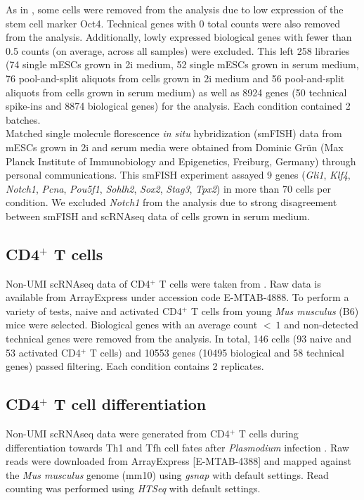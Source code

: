As in \cite{Grun2014}, some cells were removed from the analysis due to low expression of the stem cell marker Oct4. Technical genes with 0 total counts were also removed from the analysis. Additionally, lowly expressed biological genes with fewer than 0.5 counts (on average, across all samples) were excluded. This left 258 libraries (74 single mESCs grown in 2i medium, 52 single mESCs grown in serum medium, 76 pool-and-split aliquots from cells grown in 2i medium and 56 pool-and-split aliquots from cells grown in serum medium) as well as 8924 genes (50 technical spike-ins and 8874 biological genes) for the analysis. Each condition contained 2 batches.\\

Matched single molecule florescence \textit{in situ} hybridization (smFISH) data from mESCs grown in 2i and serum media were obtained from Dominic Gr\"un (Max Planck Institute of Immunobiology and Epigenetics, Freiburg, Germany) through personal communications. This smFISH experiment assayed 9 genes (\textit{Gli1}, \textit{Klf4}, \textit{Notch1}, \textit{Pcna}, \textit{Pou5f1}, \textit{Sohlh2}, \textit{Sox2}, \textit{Stag3}, \textit{Tpx2}) in more than 70 cells per condition. We excluded \textit{Notch1} from the analysis due to strong disagreement between smFISH and scRNAseq data of cells grown in serum medium.

\subsection{CD4$^+$ T cells} \label{seq::data_cd4}

Non-UMI scRNAseq data of CD4$^+$ T cells were taken from \cite{Martinez-jimenez2017}. Raw data is available from ArrayExpress under accession code E-MTAB-4888. To perform a variety of tests, naive and activated CD4$^+$ T cells from young \emph{Mus musculus} (B6) mice were selected. Biological genes with an average count $<~1$ and non-detected technical genes were removed from the analysis. In total, 146 cells (93 naive and 53 activated CD4$^+$ T cells) and 10553 genes (10495 biological and 58 technical genes) passed filtering. Each condition contains 2 replicates.

\subsection{CD4$^+$ T cell differentiation} \label{seq::data_cd4diff}
Non-UMI scRNAseq data were generated from CD4$^+$ T cells during differentiation towards Th1 and Tfh cell fates after \emph{Plasmodium} infection \citep{Lonnberg2017}. Raw reads were downloaded from ArrayExpress [E-MTAB-4388] and mapped against the \emph{Mus musculus} genome (mm10) using \emph{gsnap} \citep{Wu2010a} with default settings. Read counting was performed using \emph{HTSeq} \citep{Anders2014} with default settings. \\

